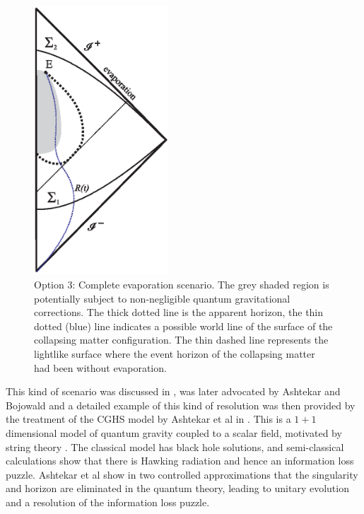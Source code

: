 \documentclass[12pt]{article}
\begin{document}
\begin{figure}[ht]
\centering 
\includegraphics[width=5cm]{evap3.eps}

\caption{Option 3: Complete evaporation scenario. The grey shaded region is potentially subject to non-negligible quantum gravitational corrections.
The thick dotted line is the apparent horizon, the thin dotted (blue) line indicates a possible world line of the surface of the collapsing
matter configuration. The thin dashed line represents the lightlike surface where the event horizon of the collapsing matter 
had been without evaporation. \label{fig2}}
\end{figure}
  
 
This kind of scenario was discussed in \cite{Hasslacher:1980hd,Frolov:1981mz}, was later advocated by Ashtekar and Bojowald \cite{Abhay-Martin} and a detailed example of this kind of resolution was then provided by the treatment of the CGHS model \cite{CGHS} by Ashtekar et al in \cite{Ashtekar:2008jd}.
This is a $1+1$ dimensional model of quantum gravity coupled to a scalar field, motivated by string theory \cite{CGHSrev1,CGHSrev2}.  The classical
model has black hole solutions, and semi-classical calculations show that there is Hawking radiation and hence an information loss
puzzle. 
Ashtekar et al show in two controlled approximations that the singularity and horizon are eliminated in the quantum theory, leading to unitary evolution and a resolution of the information loss puzzle. 
\end{document}
